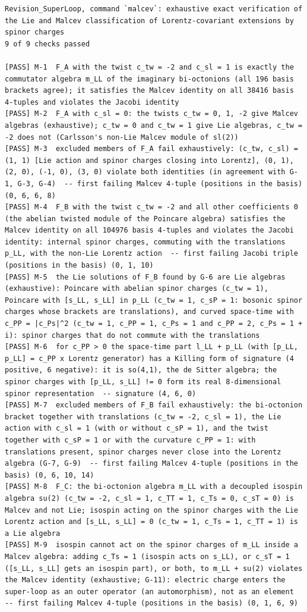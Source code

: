 \documentclass[
  10pt,
]{article}
\begin{document}
\begin{verbatim}
Revision_SuperLoop, command `malcev`: exhaustive exact verification of the Lie and Malcev classification of Lorentz-covariant extensions by spinor charges
9 of 9 checks passed

[PASS] M-1  F_A with the twist c_tw = -2 and c_sl = 1 is exactly the commutator algebra m_LL of the imaginary bi-octonions (all 196 basis brackets agree); it satisfies the Malcev identity on all 38416 basis 4-tuples and violates the Jacobi identity
[PASS] M-2  F_A with c_sl = 0: the twists c_tw = 0, 1, -2 give Malcev algebras (exhaustive); c_tw = 0 and c_tw = 1 give Lie algebras, c_tw = -2 does not (Carlsson's non-Lie Malcev module of sl(2))
[PASS] M-3  excluded members of F_A fail exhaustively: (c_tw, c_sl) = (1, 1) [Lie action and spinor charges closing into Lorentz], (0, 1), (2, 0), (-1, 0), (3, 0) violate both identities (in agreement with G-1, G-3, G-4)  -- first failing Malcev 4-tuple (positions in the basis) (0, 6, 6, 8)
[PASS] M-4  F_B with the twist c_tw = -2 and all other coefficients 0 (the abelian twisted module of the Poincare algebra) satisfies the Malcev identity on all 104976 basis 4-tuples and violates the Jacobi identity: internal spinor charges, commuting with the translations p_LL, with the non-Lie Lorentz action  -- first failing Jacobi triple (positions in the basis) (0, 1, 10)
[PASS] M-5  the Lie solutions of F_B found by G-6 are Lie algebras (exhaustive): Poincare with abelian spinor charges (c_tw = 1), Poincare with [s_LL, s_LL] in p_LL (c_tw = 1, c_sP = 1: bosonic spinor charges whose brackets are translations), and curved space-time with c_PP = |c_Ps|^2 (c_tw = 1, c_PP = 1, c_Ps = 1 and c_PP = 2, c_Ps = 1 + i): spinor charges that do not commute with the translations
[PASS] M-6  for c_PP > 0 the space-time part l_LL + p_LL (with [p_LL, p_LL] = c_PP x Lorentz generator) has a Killing form of signature (4 positive, 6 negative): it is so(4,1), the de Sitter algebra; the spinor charges with [p_LL, s_LL] != 0 form its real 8-dimensional spinor representation  -- signature (4, 6, 0)
[PASS] M-7  excluded members of F_B fail exhaustively: the bi-octonion bracket together with translations (c_tw = -2, c_sl = 1), the Lie action with c_sl = 1 (with or without c_sP = 1), and the twist together with c_sP = 1 or with the curvature c_PP = 1: with translations present, spinor charges never close into the Lorentz algebra (G-7, G-9)  -- first failing Malcev 4-tuple (positions in the basis) (0, 6, 10, 14)
[PASS] M-8  F_C: the bi-octonion algebra m_LL with a decoupled isospin algebra su(2) (c_tw = -2, c_sl = 1, c_TT = 1, c_Ts = 0, c_sT = 0) is Malcev and not Lie; isospin acting on the spinor charges with the Lie Lorentz action and [s_LL, s_LL] = 0 (c_tw = 1, c_Ts = 1, c_TT = 1) is a Lie algebra
[PASS] M-9  isospin cannot act on the spinor charges of m_LL inside a Malcev algebra: adding c_Ts = 1 (isospin acts on s_LL), or c_sT = 1 ([s_LL, s_LL] gets an isospin part), or both, to m_LL + su(2) violates the Malcev identity (exhaustive; G-11): electric charge enters the super-loop as an outer operator (an automorphism), not as an element  -- first failing Malcev 4-tuple (positions in the basis) (0, 1, 6, 9)
\end{verbatim}
\end{document}
